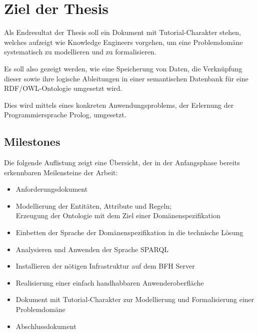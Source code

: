 \chapter{Ziel der Thesis}
\label{chap:thesisziel}
Als Endresultat der Thesis soll ein Dokument mit Tutorial-Charakter stehen, welches aufzeigt wie Knowledge Engineers vorgehen, um eine Problemdomäne systematisch zu modellieren und zu formalisieren.

Es soll also gezeigt werden, wie eine Speicherung von Daten, die Verknüpfung dieser sowie ihre logische Ableitungen in einer semantischen Datenbank für eine RDF/OWL-Ontologie umgesetzt wird.~\cite{Aufgabenstellung}

Dies wird mittels eines konkreten Anwendungsproblems, der Erlernung der Programmiersprache Prolog, umgesetzt.

\section{Milestones}
\label{sec:Milestones}
Die folgende Auflistung zeigt eine Übersicht, der in der Anfangsphase bereits erkennbaren Meilensteine der Arbeit:
\begin{itemize}
	\item Anforderungsdokument
	\item Modellierung der Entitäten, Attribute und Regeln;\\ Erzeugung der Ontologie mit dem Ziel einer Domänenspezifikation
	\item Einbetten der Sprache der Domänenspezifikation in die technische Lösung 
	\item Analysieren und Anwenden der Sprache SPARQL
	\item Installieren der nötigen Infrastruktur auf dem BFH Server
	\item Realisierung einer einfach handhabbaren Anwenderoberfläche
	\item Dokument mit Tutorial-Charakter zur Modellierung und Formalisierung einer Problemdomäne
	\item Abschlussdokument
\end{itemize}

